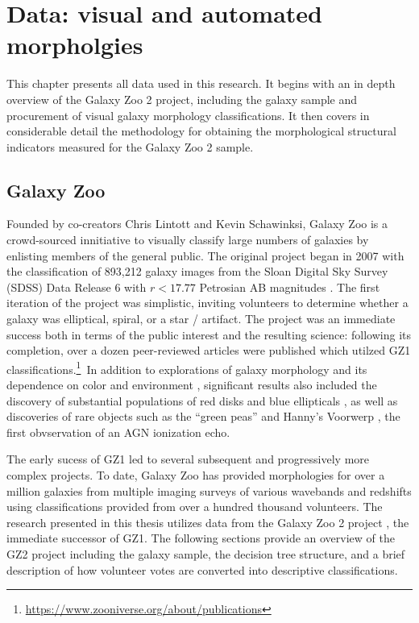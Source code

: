 
\chapter{Data: visual and automated morpholgies}
\label{chap:2}


This chapter presents all data used in this research. It begins with an in depth overview of the Galaxy Zoo 2 project, including the galaxy sample and procurement of visual galaxy morphology classifications. It then covers in considerable detail the methodology for obtaining the morphological structural indicators measured for the Galaxy Zoo 2 sample. 


\section{Galaxy Zoo}

Founded by co-creators Chris Lintott and Kevin Schawinksi, Galaxy Zoo is a crowd-sourced innitiative to visually classify large numbers of galaxies by enlisting members of the general public. The original project \citep[GZ1,][]{Lintott2008} began in 2007 with the classification of 893,212 galaxy images from the Sloan Digital Sky Survey (SDSS) Data Release 6 with $r < 17.77$ Petrosian AB magnitudes \citep{Strauss2002,Adelman2008}. The first iteration of the project was simplistic, inviting volunteers to determine whether a galaxy was elliptical, spiral, or a star / artifact. The project was an immediate success both in terms of the public interest and the resulting science: following its completion, over a dozen peer-reviewed articles were published which utilzed GZ1 classifications.\footnote{\url{https://www.zooniverse.org/about/publications}}~In addition to explorations of galaxy morphology and its dependence on color and environment \citep{Skibba2009, Bamford2009}, significant results also included the discovery of substantial populations of red disks \citep{Masters2010b} and blue ellipticals \citep{Schawinski2009}, as well as discoveries of rare objects such as the ``green peas'' \citep{Cardamone2009} and Hanny's Voorwerp \citep{Lintott2009}, the first obvservation of an AGN ionization echo. 

The early sucess of GZ1 led to several subsequent and progressively more complex projects. To date, Galaxy Zoo has provided morphologies for over a million galaxies from multiple imaging surveys of various wavebands and redshifts using classifications provided from over a hundred thousand volunteers. The research presented in this thesis utilizes data from the Galaxy Zoo 2 project \citep[GZ2,][]{Willett2013}, the immediate successor of GZ1. The following sections provide an overview of the GZ2 project including the galaxy sample, the decision tree structure, and a brief description of how volunteer votes are converted into descriptive classifications. 

